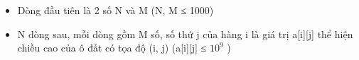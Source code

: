 \begin{itemize}
	\item Dòng đầu tiên là 2 số N và M (N, M ≤ 1000)
	\item N dòng sau, mỗi dòng gồm M số, số thứ j của hàng i là giá trị a[i][j] thể hiện chiều cao của ô đất có tọa độ (i, j) (a[i][j] ≤ $10^{9}$ )
\end{itemize}